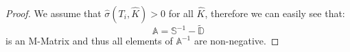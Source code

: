 \documentclass[letterpaper,12pt,titlepage,oneside,final]{book}
\numberwithin{equation}{section}
\theoremstyle{definition}
\begin{document}
\begin{proof}




		We assume that $\widehat{\sigma}(T_i,\widehat{K})>0$ for all $\widehat{K}$, therefore we can easily see that:
		\[\mathcal{\mathbb{A}}=\mathcal{\mathbb{S}}^{-1}-\widetilde{\mathcal{\mathbb{D}}}\]
		is an M-Matrix \cite{plemmons1977m} and thus all elements of $\mathcal{\mathbb{A}}^{-1}$ are non-negative.


\end{proof}
\end{document}
